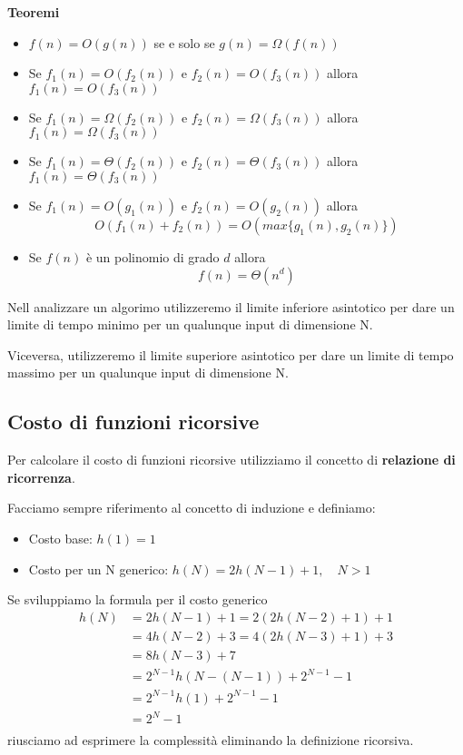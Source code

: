 \documentclass{article}
\begin{document}
\noindent\textbf{Teoremi}
\begin{itemize}
    \item \(f(n) = O\left(g(n)\right)\) se e solo se \(g(n) = \Omega\left(f(n)\right)\)
    \item Se \(f_1(n) = O\left(f_2(n)\right)\) e \(f_2(n) = O\left(f_3(n)\right)\) allora \(f_1(n) = O\left(f_3 (n)\right)\)
    \item Se \(f_1(n) = \Omega\left(f_2(n)\right)\) e \(f_2(n) = \Omega\left(f_3(n)\right)\) allora \(f_1(n) = \Omega\left(f_3 (n)\right)\)
    \item Se \(f_1(n) = \Theta\left(f_2(n)\right)\) e \(f_2(n) = \Theta\left(f_3(n)\right)\) allora \(f_1(n) = \Theta\left(f_3 (n)\right)\)
    \item Se \(f_1(n) = O\left(g_1(n)\right)\) e \(f_2(n) = O\left(g_2(n)\right)\) allora \[O\left(f_1(n) + f_2(n)\right) = O\left(max\{g_1(n), g_2(n)\}\right)\]
    \item Se \(f(n)\) è un polinomio di grado \(d\) allora \[f(n) = \Theta\left(n^d\right)\]
\end{itemize}

Nell analizzare un algorimo utilizzeremo il limite inferiore asintotico per dare un limite di tempo minimo per un qualunque input di dimensione N.

Viceversa, utilizzeremo il limite superiore asintotico per dare un limite di tempo massimo per un qualunque input di dimensione N.

\subsection{Costo di funzioni ricorsive}
Per calcolare il costo di funzioni ricorsive utilizziamo il concetto di \textbf{relazione di ricorrenza}.

Facciamo sempre riferimento al concetto di induzione e definiamo:
\begin{itemize}
    \item Costo base: \(h(1) = 1\)
    \item Costo per un N generico: \(h(N) = 2h(N - 1) + 1,\quad N > 1\)
\end{itemize}

Se sviluppiamo la formula per il costo generico
\begin{align*}
    h(N) & = 2h(N - 1) + 1 = 2(2h(N - 2) + 1) + 1           \\
         & = 4h(N - 2) + 3 = 4(2h(N - 3) + 1) + 3           \\
         & = 8h(N - 3) + 7                                  \\
         & = 2^{N-1}h\left(N - (N - 1)\right) + 2^{N-1} - 1 \\
         & = 2^{N-1}h(1) + 2^{N-1} - 1                      \\
         & = 2^{N} - 1                                      \\
\end{align*}
riusciamo ad esprimere la complessità eliminando la definizione ricorsiva.
\end{document}
